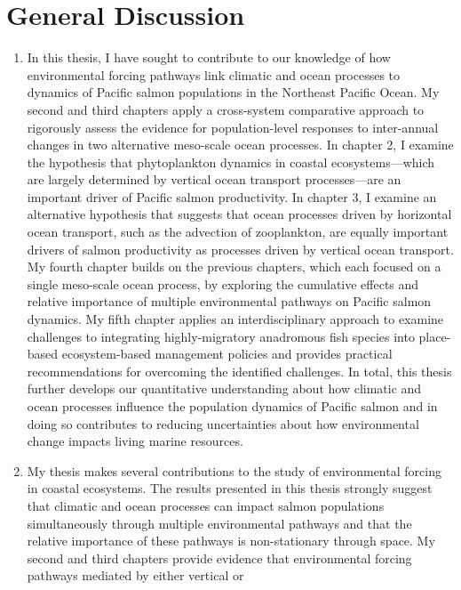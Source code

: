 \chapter{General Discussion}\label{general-discussion}

\begin{enumerate}
\def\labelenumi{\arabic{enumi}.}
\item
  In this thesis, I have sought to contribute to our knowledge of how
  environmental forcing pathways link climatic and ocean processes to
  dynamics of Pacific salmon populations in the Northeast Pacific Ocean.
  My second and third chapters apply a cross-system comparative approach
  to rigorously assess the evidence for population-level responses to
  inter-annual changes in two alternative meso-scale ocean processes. In
  chapter 2, I examine the hypothesis that phytoplankton dynamics in
  coastal ecosystems---which are largely determined by vertical ocean
  transport processes---are an important driver of Pacific salmon
  productivity. In chapter 3, I examine an alternative hypothesis that
  suggests that ocean processes driven by horizontal ocean transport,
  such as the advection of zooplankton, are equally important drivers of
  salmon productivity as processes driven by vertical ocean transport.
  My fourth chapter builds on the previous chapters, which each focused
  on a single meso-scale ocean process, by exploring the cumulative
  effects and relative importance of multiple environmental pathways on
  Pacific salmon dynamics. My fifth chapter applies an interdisciplinary
  approach to examine challenges to integrating highly-migratory
  anadromous fish species into place-based ecosystem-based management
  policies and provides practical recommendations for overcoming the
  identified challenges. In total, this thesis further develops our
  quantitative understanding about how climatic and ocean processes
  influence the population dynamics of Pacific salmon and in doing so
  contributes to reducing uncertainties about how environmental change
  impacts living marine resources.
\item
  My thesis makes several contributions to the study of environmental
  forcing in coastal ecosystems. The results presented in this thesis
  strongly suggest that climatic and ocean processes can impact salmon
  populations simultaneously through multiple environmental pathways and
  that the relative importance of these pathways is non-stationary
  through space. My second and third chapters provide evidence that
  environmental forcing pathways mediated by either vertical or

\end{enumerate}
